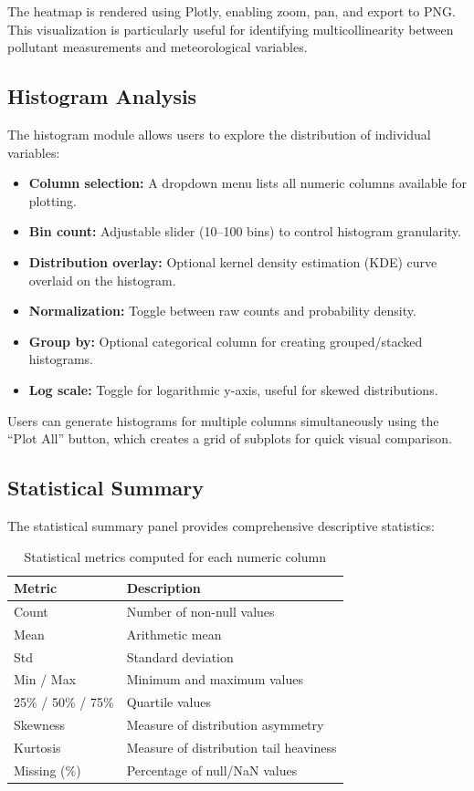 \noindent The heatmap is rendered using Plotly, enabling zoom, pan, and export to PNG. This visualization is particularly useful for identifying multicollinearity between pollutant measurements and meteorological variables.

\subsection{Histogram Analysis}

The histogram module allows users to explore the distribution of individual variables:

\begin{itemize}
    \item \textbf{Column selection:} A dropdown menu lists all numeric columns available for plotting.
    \item \textbf{Bin count:} Adjustable slider (10--100 bins) to control histogram granularity.
    \item \textbf{Distribution overlay:} Optional kernel density estimation (KDE) curve overlaid on the histogram.
    \item \textbf{Normalization:} Toggle between raw counts and probability density.
    \item \textbf{Group by:} Optional categorical column for creating grouped/stacked histograms.
    \item \textbf{Log scale:} Toggle for logarithmic y-axis, useful for skewed distributions.
\end{itemize}

\noindent Users can generate histograms for multiple columns simultaneously using the ``Plot All'' button, which creates a grid of subplots for quick visual comparison.

\subsection{Statistical Summary}

The statistical summary panel provides comprehensive descriptive statistics:

\begin{table}[htbp]
\centering
\caption{Statistical metrics computed for each numeric column}
\label{tab:stats-summary}
\begin{tabular}{|l|l|}
\hline
\textbf{Metric} & \textbf{Description} \\
\hline
Count & Number of non-null values \\
\hline
Mean & Arithmetic mean \\
\hline
Std & Standard deviation \\
\hline
Min / Max & Minimum and maximum values \\
\hline
25\% / 50\% / 75\% & Quartile values \\
\hline
Skewness & Measure of distribution asymmetry \\
\hline
Kurtosis & Measure of distribution tail heaviness \\
\hline
Missing (\%) & Percentage of null/NaN values \\
\hline
\end{tabular}
\end{table}

